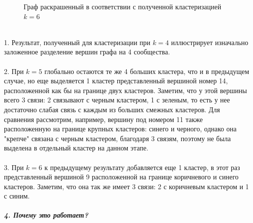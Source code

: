\documentclass[a5paper, 10pt]{article}
\theoremstyle{definition}
\theoremstyle{plain}
\theoremstyle{remark}
\begin{document}
\begin{figure}[h!]
\caption{Граф раскрашенный в соответствии с полученной кластеризацией $k=6$}
\end{figure}
\\
1. Результат, полученный для кластеризации при $k=4$ иллюстрирует изначально заложенное разделение вершин графа на 4 сообщества.\\
\\2. При $k=5$ глобально остаются те же 4 больших кластера, что и в предыдущем случае, но еще выделяется 1 кластер представленный вершиной номер 14, расположенной как бы на границе двух кластеров. Заметим, что у этой вершины всего 3 связи: 2 связывают с черным кластером, 1 с зеленым, то есть у нее достаточно слабая связь с каждым из больших смежных кластеров. Для сравнения рассмотрим, например, вершину под номером 11 также расположенную на границе крупных кластеров: синего и черного, однако она "крепче" связана с черным кластером, благодаря 3 связям, поэтому не была выделена в отдельный кластер на данном этапе.\\
\\3. При $k=6$ к предыдущему результату добавляется еще 1 кластер, в этот раз представленный вершиной 9 расположенной на границе коричневого и синего кластеров. Заметим, что она так же имеет 3 связи: 2 с коричневым кластером и 1 с синим.\\
\\
\textbf{\textit{4. Почему это работает?}}\\
\end{document}
